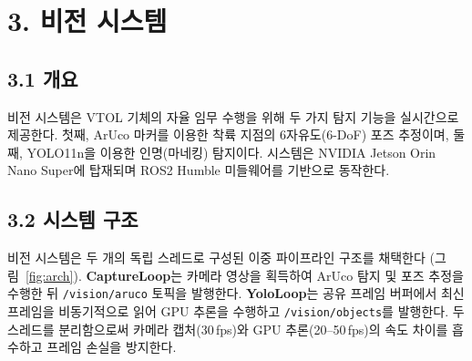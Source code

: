 \documentclass[11pt,a4paper]{article}
\begin{document}
\section*{3. 비전 시스템}

\subsection*{3.1 개요}

비전 시스템은 VTOL 기체의 자율 임무 수행을 위해 두 가지 탐지 기능을 실시간으로
제공한다. 첫째, ArUco 마커를 이용한 착륙 지점의 6자유도(6-DoF) 포즈 추정이며,
둘째, YOLO11n을 이용한 인명(마네킹) 탐지이다. 시스템은 NVIDIA Jetson Orin Nano
Super에 탑재되며 ROS2 Humble 미들웨어를 기반으로 동작한다.

\subsection*{3.2 시스템 구조}

비전 시스템은 두 개의 독립 스레드로 구성된 이중 파이프라인 구조를 채택한다
(그림~\ref{fig:arch}). \textbf{CaptureLoop}는 카메라 영상을 획득하여 ArUco
탐지 및 포즈 추정을 수행한 뒤 \texttt{/vision/aruco} 토픽을 발행한다.
\textbf{YoloLoop}는 공유 프레임 버퍼에서 최신 프레임을 비동기적으로 읽어
GPU 추론을 수행하고 \texttt{/vision/objects}를 발행한다. 두 스레드를 분리함으로써
카메라 캡처(30\,fps)와 GPU 추론(20--50\,fps)의 속도 차이를 흡수하고
프레임 손실을 방지한다.
\end{document}
